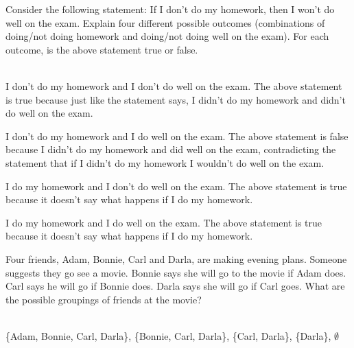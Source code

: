 \documentclass[12 pt]{exam}
\begin{document}
\begin{questions}

\question Consider the following statement: If I don't do my homework, then I won't do well on the exam. Explain four different possible outcomes (combinations of doing/not doing homework and doing/not doing well on the exam). For each outcome, is the above statement true or false. 
\begin{solution}\\
I don't do my homework and I don't do well on the exam. The above statement is true because just like the statement says, I didn't do my homework and didn't do well on the exam.

I don't do my homework and I do well on the exam. The above statement is false because I didn't do my homework and did well on the exam, contradicting the statement that if I didn't do my homework I wouldn't do well on the exam.

I do my homework and I don't do well on the exam. The above statement is true because it doesn't say what happens if I do my homework.

I do my homework and I do well on the exam. The above statement is true because it doesn't say what happens if I do my homework.
\end{solution}


\question Four friends, Adam, Bonnie, Carl and Darla, are making evening plans. Someone suggests they go see a movie. Bonnie says she will go to the movie if Adam does. Carl says he will go if Bonnie does. Darla says she will go if Carl goes. What are the possible groupings of friends at the movie?
\begin{solution}\\
\{Adam, Bonnie, Carl, Darla\}, \{Bonnie, Carl, Darla\}, \{Carl, Darla\}, \{Darla\}, $\emptyset$
\end{solution}


\end{questions}
\end{document}
